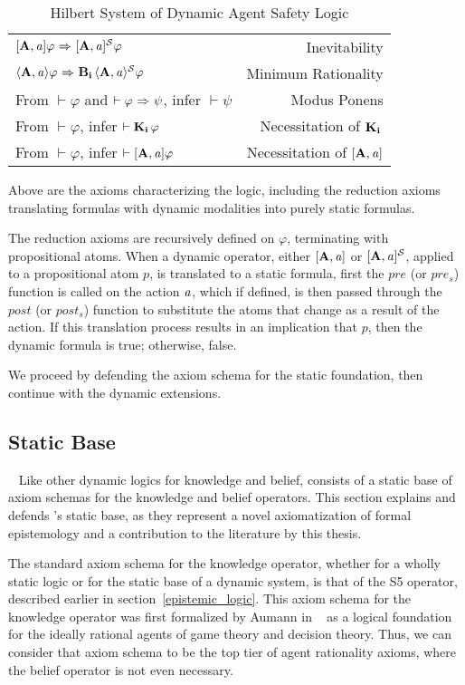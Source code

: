 \begin{table}[H]
\begin{center}
\begin{tabular}{| l r |}
    $\mathbf{[A,\mathit{a}]}\varphi {\ \Rightarrow \ } \mathbf{[A,\mathit{a}]^\mathcal{S}}\varphi$ & Inevitability\\
    $\mathbf{\langle A,\mathit{a}\rangle}\varphi {\ \Rightarrow \ } \mathbf{B}_{\mathbf{i}}\,\mathbf{\langle A,\mathit{a}\rangle^\mathcal{S}}\varphi$ & Minimum Rationality\\
    From $\vdash \varphi$ and $\vdash \varphi {\ \Rightarrow \ } \psi$, infer $\vdash\psi$ & Modus Ponens\\
    From $\vdash \varphi$, infer $\vdash \mathbf{K}_{\mathbf{i}}\,\varphi$ & Necessitation of $\mathbf{K}_{\mathbf{i}}\,$\\
    From $\vdash \varphi$, infer $\vdash \mathbf{[A,\mathit{a}]}\varphi$ & Necessitation of $\mathbf{[A,\mathit{a}]}$\\
	\hline
\end{tabular}
\caption{Hilbert System of Dynamic Agent Safety Logic}
\end{center}
\end{table}

Above are the axioms characterizing the logic, including the reduction axioms translating formulas with dynamic modalities into purely static formulas.

The reduction axioms are recursively defined on $\varphi$, terminating with propositional atoms. When a dynamic operator, either $\mathbf{[A,\mathit{a}]}$ or $\mathbf{[A,\mathit{a}]^\mathcal{S}}$, applied to a propositional atom $p$, is translated to a static formula, first the $pre$ (or $pre_s$) function is called on the action $\mathit{a}$, which if defined, is then passed through the $post$ (or $post_s$) function to substitute the atoms that change as a result of the action. If this translation process results in an implication that $p$, then the dynamic formula is true; otherwise, false.

 We proceed by defending the axiom schema for the static foundation, then continue with the dynamic extensions.

\subsection{Static Base}~\label{static}
Like other dynamic logics for knowledge and belief, \DASL consists of a static base of axiom schemas for the knowledge and belief operators. This section explains and defends \DASL's static base, as they represent a novel axiomatization of formal epistemology and a contribution to the literature by this thesis. 

The standard axiom schema for the knowledge operator, whether for a wholly static logic or for the static base of a dynamic system, is that of the S5 operator, described earlier in section~\ref{epistemic_logic}. This axiom schema for the knowledge operator was first formalized by Aumann in ~\cite{Aumann} as a logical foundation for the ideally rational agents of game theory and decision theory. Thus, we can consider that axiom schema to be the top tier of agent rationality axioms, where the belief operator is not even necessary.


